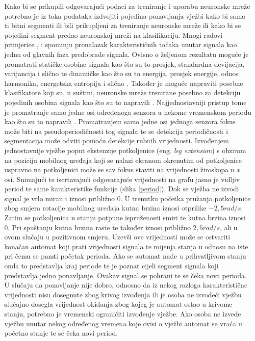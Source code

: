 \documentclass[times, utf8, diplomski]{fer}
\begin{document}
Kako bi se prikupili odgovarajući podaci za treniranje i uporabu neuronske mreže potrebno je iz toka podataka izdvojiti pojedina ponavljanja vježbi kako bi samo ti bitni
segmenti ili bili prikupljeni za treniranje neuronske mreže ili kako bi se pojedini segment predao neuronskoj mreži na klasifikaciju. 
Mnogi radovi primjerice \cite{android}, \cite{exo} i \cite{LowerLimb} spominju pronalazak karakterističnih točaka unutar signala
kao jednu od glavnih faza predobrade signala. Ovisno o željenom rezultatu moguće je promatrati statičke osobine signala
kao što su to prosjek, standardna devijacija, varijancija i slično te dinamičke kao što su to energija, prosjek energije, odnos
harmonika, energetska entropija i slično \citep{android}. Također je moguće napraviti posebne klasifikatore koji su, u suštini,
neuronske mreže trenirane posebno za detekciju pojedinih osobina signala kao što su to napravili \cite{exo}. 
Najjednostavniji pristup tome je promatranje samo jedne osi određenoga senzora u nekome vremenskom periodu kao što su to napravili
\cite{LowerLimb}. Promatranjem samo jedne osi jednoga senzora fokus može biti na pseudoperiodičnosti tog signala te se detekcija
periodičnosti i segmentacija može odviti pomoću detekcije rubnih vrijednosti. Izvođenjem jednostavnije vježbe poput ekstenzije
potkoljenice (eng. \textit{leg extension}) s obzirom na poziciju mobilnog uređaja koji se nalazi ekranom okrenutim od potkoljenice uspravno na
potkoljenici može se sav fokus staviti na vrijednosti žiroskopa u $x$ osi. Snimajući te iscrtavajući odgovarajuće vrijednosti
na grafu jasno je vidljiv period te same karakteristike funkcije (slika \ref{period}). Dok se vježba ne izvodi signal je
vrlo miran i iznosi približno 0. U trenutku početka pružanja potkoljenice zbog smjera rotacije mobilnog uređaja kutna brzina iznosi
otprilike $-2,5 rad/s$. Zatim se potkoljenica u stanju potpune ispruženosti smiri te kutna brzina iznosi 0. Pri spuštanju kutna
brzina raste te također iznosi približno $2,5 rad/s$, ali u ovom slučaju u pozitivnom smjeru. Uzevši ove vrijednosti može se ostvariti
konačan automat koji prati vrijednosti signala te mijenja stanja u odnosu na iste pri čemu se pamti početak perioda. Ako se automat nađe u
prihvatljivom stanju onda to predstavlja kraj periode te je poznat cijeli segment signala koji predstavlja jedno ponavljanje.
Ovakav signal se pohrani te se čeka nova perioda. U slučaju da ponavljanje nije dobro, odnosno da iz nekog razloga
karakteristične vrijednosti nisu dosegnute zbog krivog izvođenja ili je osoba ne izvodeći vježbu slučajno
dosegla vrijednost okidanja zbog kojeg je automat ostao u krivome stanju, potrebno je vremenski ograničiti
izvođenje vježbe. Ako osoba ne izvede vježbu unutar nekog određenog vremena koje ovisi o vježbi automat se vraća
u početno stanje te se čeka novi period.
\end{document}
